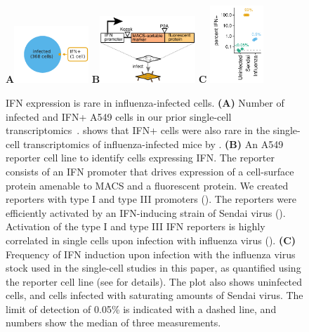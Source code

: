 \documentclass[9pt,lineno]{elife}
\begin{document}
\begin{figure}
\centerline{
{\bf \Large A}\includegraphics[width=0.25\textwidth,valign=t]{figures/IFN_stochastic/RussellVenn/venn_diagram.pdf}
\hspace{0.02\textwidth}
{\bf \Large B}\includegraphics[width=0.32\textwidth,valign=t]{figures/IFN_stochastic/IFN_reporter/IFN_reporter.pdf}
\hspace{0.02\textwidth}
{\bf \Large C} \includegraphics[width=0.18\textwidth,valign=t]{figures/IFN_stochastic/Flow/ifn_percent.pdf}
}
\caption{
IFN expression is rare in influenza-infected cells.
{\bf (A)} Number of infected and IFN+ A549 cells in our prior single-cell transcriptomics~\citep{russell2018extreme}.
 shows that IFN+ cells were also rare in the single-cell transcriptomics of influenza-infected mice by \citet{steuerman2018dissection}.
{\bf (B)} An A549 reporter cell line to identify cells expressing IFN.
The reporter consists of an IFN promoter that drives expression of a cell-surface protein amenable to MACS and a fluorescent protein.
We created reporters with type I and type III promoters ().
The reporters were efficiently activated by an IFN-inducing strain of Sendai virus ().
Activation of the type I and type III IFN reporters is highly correlated in single cells upon infection with influenza virus ().
{\bf (C)}
Frequency of IFN induction upon infection with the influenza virus stock used in the single-cell studies in this paper, as quantified using the reporter cell line (see  for details).
The plot also shows uninfected cells, and cells infected with saturating amounts of Sendai virus.
The limit of detection of 0.05\% is indicated with a dashed line, and numbers show the median of three measurements.
}
\label{fig:IFNrare}


\end{figure}
\end{document}
